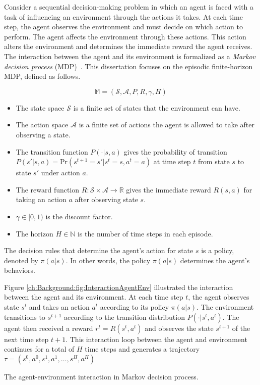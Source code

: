 Consider a sequential decision-making problem in which an agent is faced with a task of influencing an environment through the actions it takes.
At each time step,
the agent observes the environment and must decide on which action to perform.
The agent affects the environment through these actions.
This action alters the environment and determines the immediate reward the agent receives.
The interaction between the agent and its environment is formalized as a \textit{Markov decision process} (MDP)~\cite{RL_Bellman1957}.
This dissertation focuses on the episodic finite-horizon MDP,
defined as follows.

\[\mathbb{M} = (\mathcal{S},\mathcal{A},P,R,\gamma,H)\]

\begin{itemize}
  \item The state space $\mathcal{S}$ is a finite set of states that the environment can have.
  \item The action space $\mathcal{A}$ is a finite set of actions the agent is allowed to take after observing a state.
  \item The transition function $P(\cdot|s,a)$ gives the probability of transition $P(s'|s,a) = \mathrm{Pr}(s^{t+1}=s'|s^t=s,a^t=a)$ at time step $t$ from state $s$ to state $s'$ under action $a$.
  \item The reward function $R: \mathcal{S} \times \mathcal{A} \to \mathbb{R}$ gives the immediate reward $R(s,a)$ for taking an action $a$ after observing state $s$.
  \item $\gamma \in [0,1)$ is the discount factor.
  \item The horizon $H \in \mathbb{N}$ is the number of time steps in each episode.
\end{itemize}

The decision rules that determine the agent's action for state $s$ is a policy,
denoted by $\pi(a|s)$.
In other words,
the policy $\pi(a|s)$ determines the agent's behaviors.

Figure \ref{ch:Background:fig:InteractionAgentEnv} illustrated the interaction between the agent and its environment.
At each time step $t$,
the agent observes state $s^t$ and takes an action $a^t$ according to its policy $\pi(a|s)$.
The environment transitions to $s^{t+1}$ according to the transition distribution $P(\cdot|s^t,a^t)$.
The agent then received a reward $r^t = R(s^t,a^t)$ and observes the state $s^{t+1}$ of the next time step $t+1$.
This interaction loop between the agent and environment continues for a total of $H$ time steps and generates a trajectory $\tau = (s^0,a^0,s^1,a^1,\dots,s^H,a^H)$

%
{The agent-environment interaction in Markov decision process.\label{ch:Background:fig:InteractionAgentEnv}}
